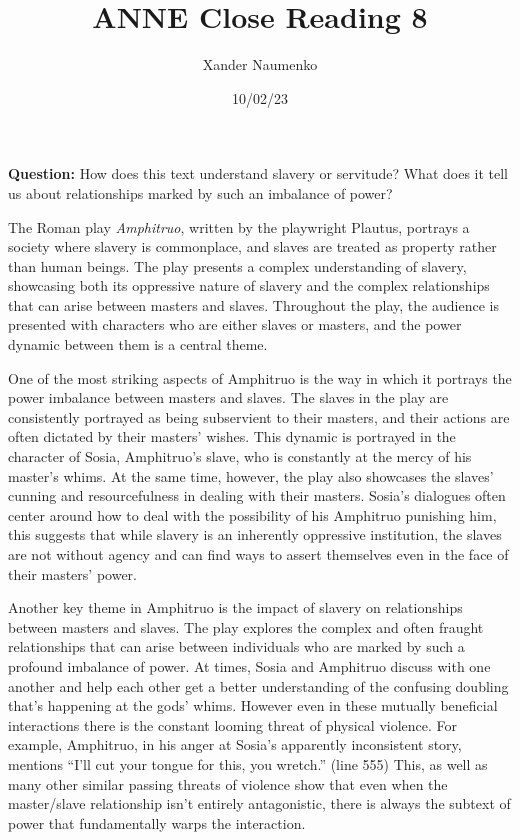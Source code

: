\documentclass[letterpaper, reqno,11pt]{article}
\begin{document}
\title{ANNE Close Reading 8}
\date{10/02/23}
\author{Xander Naumenko}
\maketitle

{\bf Question:} How does this text understand slavery or servitude? What does it tell us about relationships marked by such an imbalance of power?

\medskip

The Roman play {\em Amphitruo}, written by the playwright Plautus, portrays a society where slavery is commonplace, and slaves are treated as property rather than human beings. The play presents a complex understanding of slavery, showcasing both its oppressive nature of slavery and the complex relationships that can arise between masters and slaves. Throughout the play, the audience is presented with characters who are either slaves or masters, and the power dynamic between them is a central theme.

\medskip

One of the most striking aspects of Amphitruo is the way in which it portrays the power imbalance between masters and slaves. The slaves in the play are consistently portrayed as being subservient to their masters, and their actions are often dictated by their masters' wishes. This dynamic is portrayed in the character of Sosia, Amphitruo's slave, who is constantly at the mercy of his master's whims. At the same time, however, the play also showcases the slaves' cunning and resourcefulness in dealing with their masters. Sosia's dialogues often center around how to deal with the possibility of his Amphitruo punishing him, this suggests that while slavery is an inherently oppressive institution, the slaves are not without agency and can find ways to assert themselves even in the face of their masters' power.

\medskip

Another key theme in Amphitruo is the impact of slavery on relationships between masters and slaves. The play explores the complex and often fraught relationships that can arise between individuals who are marked by such a profound imbalance of power. At times, Sosia and Amphitruo discuss with one another and help each other get a better understanding of the confusing doubling that's happening at the gods' whims. However even in these mutually beneficial interactions there is the constant looming threat of physical violence. For example, Amphitruo, in his anger at Sosia's apparently inconsistent story, mentions ``I’ll cut your tongue for this, you wretch.'' (line 555) This, as well as many other similar passing threats of violence show that even when the master/slave relationship isn't entirely antagonistic, there is always the subtext of power that fundamentally warps the interaction. 
\end{document}

